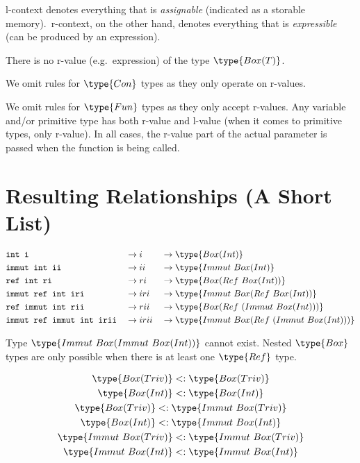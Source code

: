 \documentclass{article}
\newcommand\subtype{\mathrel{<:}}
\newcommand{\syntax}{\texttt}
\begin{document}
\medskip

l-context denotes everything that is \textit{assignable} (indicated as a
storable memory).\ r-context, on the other hand, denotes everything that is
\textit{expressible} (can be produced by an expression).

\medskip

There is no r-value (e.g.\ expression) of the type $\type{Box(T)}$.

\medskip

We omit rules for $\type{Con}$ types as they only operate on r-values.

\medskip

We omit rules for $\type{Fun}$ types as they only accept r-values.
Any variable and/or primitive type has both r-value and l-value (when it comes
to primitive types, only r-value). In all cases, the r-value part of the actual
parameter is passed when the function is being called.


\section*{Resulting Relationships (A Short List)}

\begin{align*}
  &\syntax{int i} &&\to i &&\to \type{Box(Int)}\\
  &\syntax{immut int ii} &&\to ii &&\to \type{Immut\ Box(Int)}\\
  &\syntax{ref int ri} &&\to ri &&\to \type{Box(Ref\ Box(Int))}\\
  &\syntax{immut ref int iri} &&\to iri &&\to \type{Immut\ Box(Ref\ Box(Int))}\\
  &\syntax{ref immut int rii} &&\to rii &&\to \type{Box(Ref\ (Immut\ Box(Int)))}\\
  &\syntax{immut ref immut int irii} &&\to irii &&\to \type{Immut\ Box(Ref\ (Immut\ Box(Int)))}
\end{align*}

\medskip

Type $\type{Immut\ Box(Immut\ Box(Int))}$ cannot exist. Nested $\type{Box}$
types are only possible when there is at least one $\type{Ref}$ type.

\begin{gather*}
  \type{Box(Triv)} \subtype \type{Box(Triv)}\\
  \type{Box(Int)} \subtype \type{Box(Int)}\\
  \type{Box(Triv)} \subtype \type{Immut\ Box(Triv)}\\
  \type{Box(Int)} \subtype \type{Immut\ Box(Int)}\\
  \type{Immut\ Box(Triv)} \subtype \type{Immut\ Box(Triv)}\\
  \type{Immut\ Box(Int)} \subtype \type{Immut\ Box(Int)}
\end{gather*}
\end{document}
